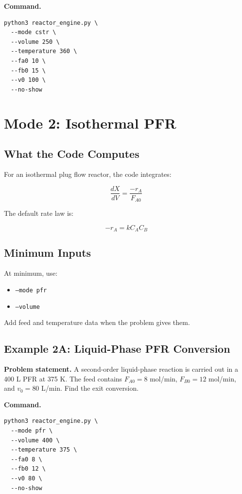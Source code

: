 \documentclass[11pt]{article}
\begin{document}
\textbf{Command.}

\begin{lstlisting}
python3 reactor_engine.py \
  --mode cstr \
  --volume 250 \
  --temperature 360 \
  --fa0 10 \
  --fb0 15 \
  --v0 100 \
  --no-show
\end{lstlisting}

\section{Mode 2: Isothermal PFR}

\subsection{What the Code Computes}

For an isothermal plug flow reactor, the code integrates:

\begin{equation}
\frac{dX}{dV}=\frac{-r_A}{F_{A0}}
\end{equation}

The default rate law is:

\begin{equation}
-r_A = kC_A C_B
\end{equation}

\subsection{Minimum Inputs}

At minimum, use:

\begin{itemize}
    \item \texttt{--mode pfr}
    \item \texttt{--volume}
\end{itemize}

Add feed and temperature data when the problem gives them.

\subsection{Example 2A: Liquid-Phase PFR Conversion}

\textbf{Problem statement.} A second-order liquid-phase reaction is carried out in a 400 L PFR at 375 K. The feed contains $F_{A0}=8$ mol/min, $F_{B0}=12$ mol/min, and $v_0=80$ L/min. Find the exit conversion.

\textbf{Command.}

\begin{lstlisting}
python3 reactor_engine.py \
  --mode pfr \
  --volume 400 \
  --temperature 375 \
  --fa0 8 \
  --fb0 12 \
  --v0 80 \
  --no-show
\end{lstlisting}
\end{document}
